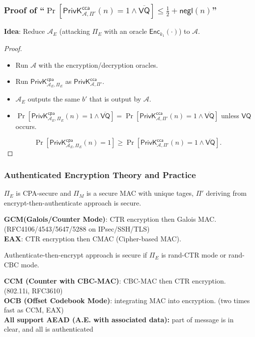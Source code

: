 \begin{frame}\frametitle{Proof of ``$\Pr[\mathsf{PrivK}^{\mathsf{cca}}_{\mathcal{A},\Pi'}(n)=1 \land \overline{\mathsf{VQ}}] \le \frac{1}{2} + \mathsf{negl}(n)$''}
\textbf{Idea}: Reduce $\mathcal{A}_E$ (attacking $\Pi_E$ with an oracle $\mathsf{Enc}_{k_1}(\cdot)$) to $\mathcal{A}$.
\begin{proof}
\begin{itemize}
\item Run $\mathcal{A}$ with the encryption/decryption oracles.
\item Run $\mathsf{PrivK}^{\mathsf{cpa}}_{\mathcal{A}_E,\Pi_E}$ as $\mathsf{PrivK}^{\mathsf{cca}}_{\mathcal{A},\Pi'}$.
\item $\mathcal{A}_E$ outputs the same $b'$ that is output by $\mathcal{A}$.
\item $\Pr[\mathsf{PrivK}^{\mathsf{cpa}}_{\mathcal{A}_E,\Pi_E}(n)=1 \land \overline{\mathsf{VQ}}] = \Pr[\mathsf{PrivK}^{\mathsf{cca}}_{\mathcal{A},\Pi'}(n)=1 \land \overline{\mathsf{VQ}}]$ unless $\mathsf{VQ}$ occurs.
\end{itemize}
\[ \Pr [\mathsf{PrivK}^{\mathsf{cpa}}_{\mathcal{A}_E,\Pi_E }(n)=1] \ge \Pr[\mathsf{PrivK}^{\mathsf{cca}}_{\mathcal{A},\Pi'}(n)=1 \land \overline{\mathsf{VQ}}].
\]
\end{proof}
\end{frame}
\begin{frame}\frametitle{Authenticated Encryption Theory and Practice}
\begin{theorem}
$\Pi_E$ is CPA-secure and $\Pi_M$ is a secure MAC with unique tages, $\Pi'$ deriving from encrypt-then-authenticate approach is secure.
\end{theorem}
\textbf{GCM(Galois/Counter Mode)}: CTR encryption then Galois MAC. (RFC4106/4543/5647/5288 on IPsec/SSH/TLS)\\
\textbf{EAX}: CTR encryption then CMAC (Cipher-based MAC).
\begin{proposition}
Authenticate-then-encrypt approach is secure if $\Pi_E$ is rand-CTR mode or rand-CBC mode.
\end{proposition}
\textbf{CCM (Counter with CBC-MAC)}: CBC-MAC then CTR encryption. (802.11i, RFC3610)\\
\textbf{OCB (Offset Codebook Mode)}: integrating MAC into encryption. (two times fast as CCM, EAX)\\
\textbf{All support AEAD (A.E. with associated data):} part of message is in clear, and all is authenticated
\end{frame}
